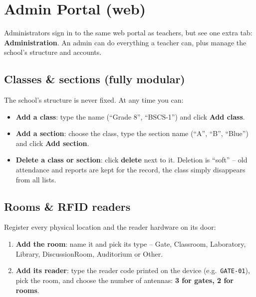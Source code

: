 \chapter{Admin Portal (web)}

Administrators sign in to the same web portal as teachers, but see one
extra tab: \textbf{Administration}. An admin can do everything a teacher
can, plus manage the school's structure and accounts.

\section{Classes \& sections (fully modular)}

The school's structure is never fixed. At any time you can:

\begin{itemize}[itemsep=2pt]
  \item \textbf{Add a class}: type the name (``Grade 8'', ``BSCS-1'')
        and click \textbf{Add class}.
  \item \textbf{Add a section}: choose the class, type the section name
        (``A'', ``B'', ``Blue'') and click \textbf{Add section}.
  \item \textbf{Delete a class or section}: click \textbf{delete} next
        to it. Deletion is ``soft'' -- old attendance and reports are
        kept for the record, the class simply disappears from all
        lists.
\end{itemize}

\section{Rooms \& RFID readers}

Register every physical location and the reader hardware on its door:

\begin{enumerate}[itemsep=2pt]
  \item \textbf{Add the room}: name it and pick its type -- Gate,
        Classroom, Laboratory, Library, DiscussionRoom, Auditorium or
        Other.
  \item \textbf{Add its reader}: type the reader code printed on the
        device (e.g.\ \texttt{GATE-01}), pick the room, and choose the
        number of antennas: \textbf{3 for gates, 2 for rooms}.
\end{enumerate}

